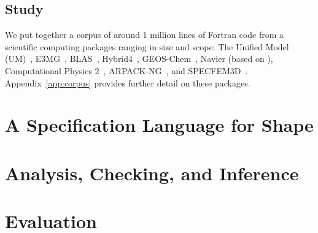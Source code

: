 \documentclass[acmlarge,review,anonymous]{acmart}\settopmatter{printfolios=true}
\begin{document}
\subsection{Study}
%
\noindent
We put together a corpus of around 1 million lines of Fortran code from a
\numPackages{} scientific computing packages ranging in size and scope: The Unified Model (UM)~\cite{um},
E3MG~\cite{RePEc:aen:journl:2006se-a12}, BLAS~\cite{blas},
Hybrid4~\cite{GBC:GBC635}, GEOS-Chem~\cite{geos-chem}, Navier (based
on \cite{griebel1997numerical}), Computational Physics
2~\cite{nicholas2006computational},
ARPACK-NG~\cite{arpackng}, and
SPECFEM3D~\cite{specfem3d}. Appendix~\ref{app:corpus} provides
further detail on these packages.

\section{A Specification Language for Shape}

\section{Analysis, Checking, and Inference}

\section{Evaluation}



\appendix

\end{document}
